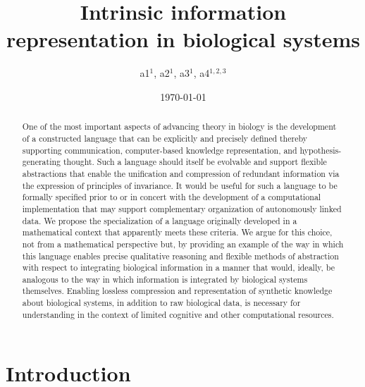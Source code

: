 \documentclass[aps,twocolumn]{revtex4-1}
\begin{document}
 

\title{\bf Intrinsic information representation in biological systems}

\author{a1$^{1}$, a2$^{1}$, a3$^{1}$, a4$^{1,2,3}$}


\date{\today}
\begin{abstract}
One of the most important aspects of advancing theory in biology is the development of a constructed language that can be explicitly and precisely defined thereby supporting communication, computer-based knowledge representation, and hypothesis-generating thought. Such a language should itself be evolvable and support flexible abstractions that enable the unification and compression of redundant information via the expression of principles of invariance. It would be useful for such a language to be formally specified prior to or in concert with the development of a computational implementation that may support complementary organization of autonomously linked data. We propose the specialization of a language originally developed in a mathematical context that apparently meets these criteria. We argue for this choice, not from a mathematical perspective but, by providing an example of the way in which this language enables precise qualitative reasoning and flexible methods of abstraction with respect to integrating biological information in a manner that would, ideally, be analogous to the way in which information is integrated by biological systems themselves. Enabling lossless compression and representation of synthetic knowledge about biological systems, in addition to raw biological data, is necessary for understanding in the context of limited cognitive and other computational resources.
\end{abstract}

\maketitle

\tableofcontents

\section{Introduction}
\end{document}
